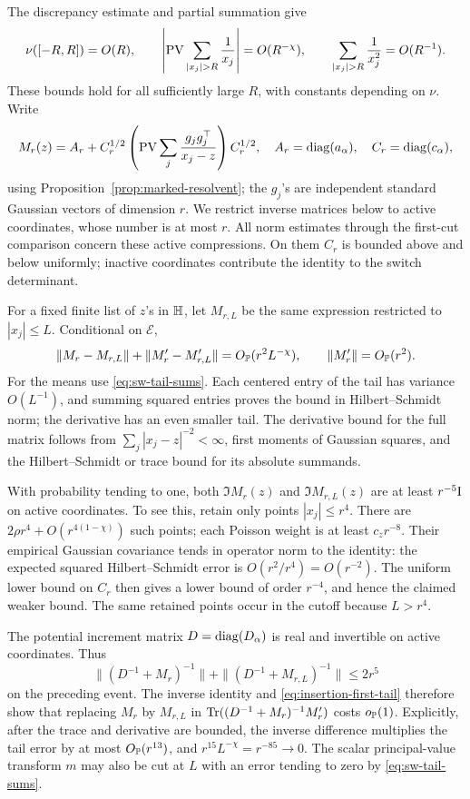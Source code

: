 The discrepancy estimate and partial summation give
\begin{equation}\label{eq:sw-tail-sums}
 \nu([-R,R])=O(R),\qquad
 \left|\PV\sum_{|x_j|>R}\frac1{x_j}\right|=O(R^{-\chi}),\qquad
 \sum_{|x_j|>R}\frac1{x_j^2}=O(R^{-1}).
\end{equation}
These bounds hold for all sufficiently large \(R\), with constants
depending on \(\nu\). Write
\[
 M_r(z)=A_r+C_r^{1/2}
       \left(\operatorname{PV}\sum_j\frac{g_jg_j^\top}{x_j-z}\right)C_r^{1/2},
 \quad A_r=\operatorname{diag}(a_\alpha),\quad C_r=\operatorname{diag}(c_\alpha),
\]
using Proposition~\ref{prop:marked-resolvent}; the \(g_j\)'s are independent
standard Gaussian vectors of dimension \(r\). We restrict inverse
matrices below to active coordinates, whose number is at most \(r\).
All norm estimates through the first-cut comparison concern these active
compressions. On them \(C_r\) is bounded above and below uniformly;
inactive coordinates contribute the identity to the switch determinant.

For a fixed finite list of \(z\)'s in \(\mathbb H\), let \(M_{r,L}\) be the
same expression restricted to \(|x_j|\le L\). Conditional on \(\mathcal E\),
\begin{equation}\label{eq:insertion-first-tail}
 \|M_r-M_{r,L}\|+\|M_r'-M_{r,L}'\|
       =O_{\mathbb P}(r^2L^{-\chi}),\qquad
 \|M_r'\|=O_{\mathbb P}(r^2).
\end{equation}
For the means use \eqref{eq:sw-tail-sums}. Each centered entry of the
tail has variance \(O(L^{-1})\), and summing squared entries proves
the bound in Hilbert--Schmidt norm; the derivative has an even smaller
tail. The derivative bound for the full matrix follows from
\(\sum_j|x_j-z|^{-2}<\infty\), first moments of Gaussian squares,
and the Hilbert--Schmidt or trace bound for its absolute summands.

With probability tending to one, both \(\Im M_r(z)\) and
\(\Im M_{r,L}(z)\) are at least \(r^{-5}\mathrm I\) on active coordinates.
To see this, retain only points \(|x_j|\le r^4\). There are
\(2\rho r^4+O(r^{4(1-\chi)})\) such points; each Poisson weight is
at least \(c_zr^{-8}\). Their empirical Gaussian covariance tends
in operator norm to the identity: the expected squared Hilbert--Schmidt
error is \(O(r^2/r^4)=O(r^{-2})\). The uniform lower bound on \(C_r\)
then gives a lower bound of order \(r^{-4}\), and hence the claimed
weaker bound. The same retained points occur in the cutoff because
\(L>r^4\).

The potential increment matrix \(D=\operatorname{diag}(D_\alpha)\) is real and
invertible on active coordinates. Thus
\[
 \|(D^{-1}+M_r)^{-1}\|+
 \|(D^{-1}+M_{r,L})^{-1}\|\le2r^5
\]
on the preceding event. The inverse identity and
\eqref{eq:insertion-first-tail} therefore show that replacing \(M_r\)
by \(M_{r,L}\) in
\(\operatorname{Tr}((D^{-1}+M_r)^{-1}M_r')\) costs \(o_{\mathbb P}(1)\).
Explicitly, after the trace and derivative are bounded, the inverse
difference multiplies the tail error by at most \(O_{\mathbb P}(r^{13})\),
and \(r^{15}L^{-\chi}=r^{-85}\to0\).
The scalar principal-value transform \(m\) may also be cut at \(L\)
with an error tending to zero by \eqref{eq:sw-tail-sums}.

